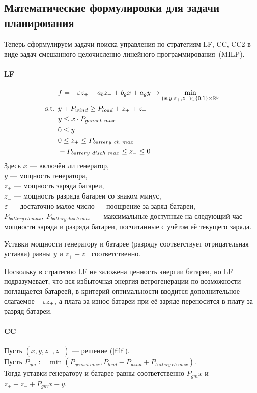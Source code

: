 \subsection{Математические формулировки для задачи планирования}
\label{sec:planning_math}
Теперь сформулируем задачи поиска управления по стратегиям LF, CC, CC2 в виде задач смешанного целочисленно-линейного программирования~(MILP).

\paragraph{LF}
\label{par:lf}
\begin{equation}\label{f:lf}
\begin{split}
\vspace{-4mm}
&f = -\eps z_+ - a_b z_- 
+ b_g x + a_g y
\rightarrow \min\limits_{(x, y, z_+, z_-) \in \{0,1\} \times \R^3 }\\
\text{s.t. }& y + P_{wind} \geq P_{load} + z_+ + z_-\\
&y \leq x \cdot P_{genset~max}\\
&0 \leq y \\
&0 \leq z_+ \leq P_{battery~ch~max} \\
&-P_{battery~disch~max} \leq z_- \leq 0 \\
\end{split}
\end{equation}
Здесь $x$ --- включён ли генератор,\\
$y$ --- мощность генератора,\\
$z_+$ --- мощность заряда батареи,\\
$z_-$ --- мощность разряда батареи со знаком минус,\\
$\varepsilon$ --- достаточно малое число --- поощрение за заряд батареи,\\
$P_{battery~ch~max},~P_{battery~disch~max}$~--- максимальные доступные на следующий час мощности заряда и разряда батареи, посчитанные с учётом её текущего заряда.

Уставки мощности генератору и батарее (разряду соответствует отрицательная уставка) равны $y$ и $z_+ + z_-$ соответственно.

Поскольку в стратегию LF не заложена ценность энергии батареи, но LF подразумевает, что вся избыточная энергия ветрогенерации по возможности поглащается батареей, в критерий оптимальности вводится дополнительное слагаемое $-\varepsilon z_+$, а плата за износ батареи при её заряде переносится в плату за разряд батареи.


\paragraph{CC}
Пусть $(x, y, z_+, z_-)$ --- решение (\ref{f:lf}).\\
Пусть $P_{gm} := \min(P_{genset~max}, P_{load}- P_{wind} + P_{battery~ch~max})$.\\
Тогда уставки генератору и батарее равны соответственно $P_{gm}x$ и $z_+ + z_- + P_{gm}x - y$.

